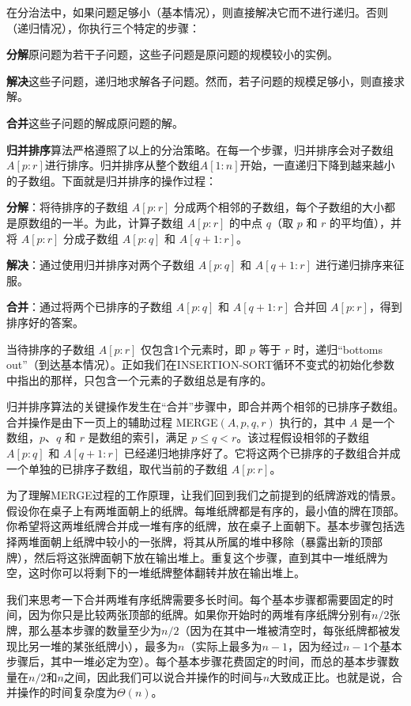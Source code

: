 \documentclass[lang=cn,newtx,10pt,scheme=chinese]{elegantbook}
\begin{document}
在分治法中，如果问题足够小（基本情况），则直接解决它而不进行递归。否则（递归情况），你执行三个特定的步骤：

\textbf{分解}原问题为若干子问题，这些子问题是原问题的规模较小的实例。

\textbf{解决}这些子问题，递归地求解各子问题。然而，若子问题的规模足够小，则直接求解。

\textbf{合并}这些子问题的解成原问题的解。

\textbf{归并排序}算法严格遵照了以上的分治策略。在每一个步骤，归并排序会对子数组$A[p:r]$进行排序。归并排序从整个数组$A[1:n]$开始，一直递归下降到越来越小的子数组。下面就是归并排序的操作过程：

\textbf{分解}：将待排序的子数组 $A[p:r]$ 分成两个相邻的子数组，每个子数组的大小都是原数组的一半。为此，计算子数组 $A[p:r]$ 的中点 $q$（取 $p$ 和 $r$ 的平均值），并将 $A[p:r]$ 分成子数组 $A[p:q]$ 和 $A[q+1:r]$。

\textbf{解决}：通过使用归并排序对两个子数组 $A[p:q]$ 和 $A[q+1:r]$ 进行递归排序来征服。

\textbf{合并}：通过将两个已排序的子数组 $A[p:q]$ 和 $A[q+1:r]$ 合并回 $A[p:r]$，得到排序好的答案。

当待排序的子数组 $A[p:r]$ 仅包含1个元素时，即 $p$ 等于 $r$ 时，递归“bottoms out”（到达基本情况）。正如我们在INSERTION-SORT循环不变式的初始化参数中指出的那样，只包含一个元素的子数组总是有序的。

归并排序算法的关键操作发生在“合并”步骤中，即合并两个相邻的已排序子数组。合并操作是由下一页上的辅助过程 MERGE$(A,p,q,r)$ 执行的，其中 $A$ 是一个数组，$p$、$q$ 和 $r$ 是数组的索引，满足 $p\le q < r$。该过程假设相邻的子数组 $A[p:q]$ 和 $A[q+1:r]$ 已经递归地排序好了。它将这两个已排序的子数组合并成一个单独的已排序子数组，取代当前的子数组 $A[p:r]$。

为了理解MERGE过程的工作原理，让我们回到我们之前提到的纸牌游戏的情景。假设你在桌子上有两堆面朝上的纸牌。每堆纸牌都是有序的，最小值的牌在顶部。你希望将这两堆纸牌合并成一堆有序的纸牌，放在桌子上面朝下。基本步骤包括选择两堆面朝上纸牌中较小的一张牌，将其从所属的堆中移除（暴露出新的顶部牌），然后将这张牌面朝下放在输出堆上。重复这个步骤，直到其中一堆纸牌为空，这时你可以将剩下的一堆纸牌整体翻转并放在输出堆上。

我们来思考一下合并两堆有序纸牌需要多长时间。每个基本步骤都需要固定的时间，因为你只是比较两张顶部的纸牌。如果你开始时的两堆有序纸牌分别有$n/2$张牌，那么基本步骤的数量至少为$n/2$（因为在其中一堆被清空时，每张纸牌都被发现比另一堆的某张纸牌小），最多为$n$（实际上最多为$n-1$，因为经过$n-1$个基本步骤后，其中一堆必定为空）。每个基本步骤花费固定的时间，而总的基本步骤数量在$n/2$和$n$之间，因此我们可以说合并操作的时间与$n$大致成正比。也就是说，合并操作的时间复杂度为$\Theta(n)$。
\end{document}
